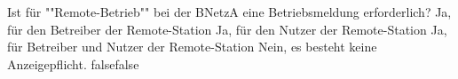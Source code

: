     {Ist für ""Remote-Betrieb"" bei der BNetzA eine Betriebsmeldung erforderlich?}
    {Ja, für den Betreiber der Remote-Station}
    {Ja, für den Nutzer der Remote-Station}
    {Ja, für Betreiber und Nutzer der Remote-Station}
    {Nein, es besteht keine Anzeigepflicht.}
    {false}{false}